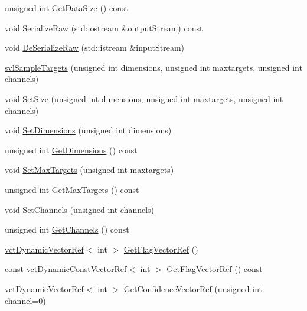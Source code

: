 \begin{DoxyCompactItemize}
unsigned int \hyperlink{classsvl_sample_targets_afc39b94054a5db5abb77182fa378c929}{Get\+Data\+Size} () const 
\item 
void \hyperlink{classsvl_sample_targets_a15e6b8cb327bdf2f9a4494d9a243e555}{Serialize\+Raw} (std\+::ostream \&output\+Stream) const 
\item 
void \hyperlink{classsvl_sample_targets_ac943c12c7fe9bd4c0cb6f4c155efb6ae}{De\+Serialize\+Raw} (std\+::istream \&input\+Stream)
\item 
\hyperlink{classsvl_sample_targets_a69de7b7432d5314fc11d898ab02f4046}{svl\+Sample\+Targets} (unsigned int dimensions, unsigned int maxtargets, unsigned int channels)
\item 
void \hyperlink{classsvl_sample_targets_a3692b97551225c23ad7b7e18efb4d236}{Set\+Size} (unsigned int dimensions, unsigned int maxtargets, unsigned int channels)
\item 
void \hyperlink{classsvl_sample_targets_af231cc042f722d534b8804affae6a354}{Set\+Dimensions} (unsigned int dimensions)
\item 
unsigned int \hyperlink{classsvl_sample_targets_aea04d136be65cd19f9321435d8a6f7f6}{Get\+Dimensions} () const 
\item 
void \hyperlink{classsvl_sample_targets_a58abe414b88508b7d5a92b57d1d374d0}{Set\+Max\+Targets} (unsigned int maxtargets)
\item 
unsigned int \hyperlink{classsvl_sample_targets_a20a7dd519c8cd41d9e627d32d1c65403}{Get\+Max\+Targets} () const 
\item 
void \hyperlink{classsvl_sample_targets_ae24efb533f1c2459a2d3aaf9d4ecd83b}{Set\+Channels} (unsigned int channels)
\item 
unsigned int \hyperlink{classsvl_sample_targets_a0903ed0823d8e2cb2d12ae3a3b75ec98}{Get\+Channels} () const 
\item 
\hyperlink{classvct_dynamic_vector_ref}{vct\+Dynamic\+Vector\+Ref}$<$ int $>$ \hyperlink{classsvl_sample_targets_aff5519cd08478348ddeafac54749aaa8}{Get\+Flag\+Vector\+Ref} ()
\item 
const \hyperlink{classvct_dynamic_const_vector_ref}{vct\+Dynamic\+Const\+Vector\+Ref}$<$ int $>$ \hyperlink{classsvl_sample_targets_a93c79ce53cd465de8f84a2469aa3656f}{Get\+Flag\+Vector\+Ref} () const 
\item 
\hyperlink{classvct_dynamic_vector_ref}{vct\+Dynamic\+Vector\+Ref}$<$ int $>$ \hyperlink{classsvl_sample_targets_a6577ff0a1e3529341d2a366d8c0a3339}{Get\+Confidence\+Vector\+Ref} (unsigned int channel=0)
\item 

\end{DoxyCompactItemize}
